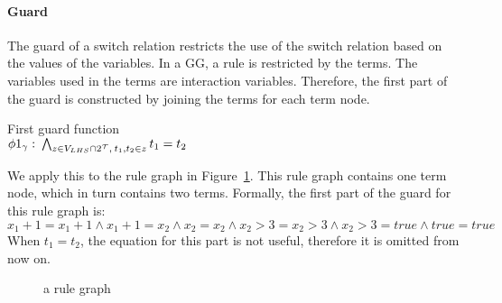\paragraph*{Guard}\label{sec:guards}
The guard of a switch relation restricts the use of the switch relation based on the values of the variables. In a GG, a rule is restricted by the terms. The variables used in the terms are interaction variables. Therefore, the first part of the guard is constructed by joining the terms for each term node.
\vspace{10px}\begin{definition} First guard function
\vspace{2px} \\
$\phi 1_{\gamma}:\: \bigwedge_{z \in V_{LHS} \cap 2^{\mathcal{T}},\: t_1, t_2 \in z}t_1 = t_2$
\end{definition}
\vspace{10px} 
We apply this to the rule graph in Figure~\ref{fig:guard_example}. This rule graph contains one term node, which in turn contains two terms. Formally, the first part of the guard for this rule graph is:
\vspace{5px} \\
$x_1+1 = x_1+1 \land x_1+1 = x_2 \land x_2 = x_2 \land x_2 > 3 = x_2 > 3 \land x_2 > 3 = true \land true = true$
\vspace{5px} \\
When $t_1 = t_2$, the equation for this part is not useful, therefore it is omitted from now on. 

\begin{figure}[h]
  \begin{center}
    
  \end{center}
  \caption{a rule graph}
  \label{fig:guard_example}
\end{figure}

